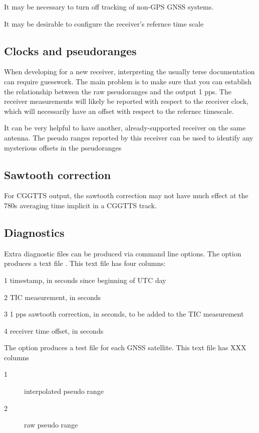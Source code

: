 It may be necessary to turn off tracking of non-GPS GNSS systems.

It may be desirable to configure the receiver's refernce time scale 
\subsection{Clocks and pseudoranges}

When developing for a new receiver, interpreting the usually terse documentation can require
guesswork. The main problem is to make sure that you can establish the relationship between the raw 
pseudoranges and the output 1 pps. The receiver measurements will likely be reported with respect to the 
receiver clock, which will necessarily have an offset with respect to the refernec timescale.


It can be very helpful to have another, already-supported receiver on the same antenna. The pseudo ranges reported 
by this receiver can be used to identify any mysterious offsets in the pseudoranges 

\subsection{Sawtooth correction}

For CGGTTS output, the sawtooth correction may not have much effect at the 780s averaging time implicit in a CGGTTS track.

\subsection{Diagnostics}

Extra diagnostic files can be produced via command line options.
The option  produces a text file . This text file has four columns:
	\begin{description*}
	\item[1] timestamp, in seconds since beginning of UTC day
	\item[2] TIC measurement, in seconds
	\item[3] 1 pps sawtooth correction, in seconds, to be added to the TIC measurement
	\item[4] receiver time offset, in seconds
	\end{description*}

The option  produces a test file  for each GNSS satellite. This text file has
XXX columns
	\begin{description}
	\item[1] interpolated pseudo range
	\item[2] raw pseudo range
	\end{description}
	
